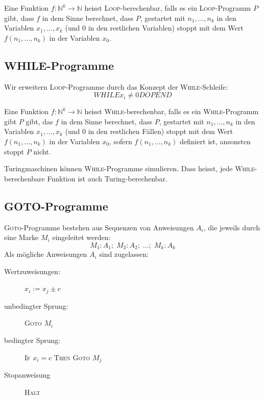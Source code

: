 \documentclass{scrartcl}
\begin{document}
\begin{shaded}
    Eine Funktion $f: \mathds{N}^k\to \mathds{N}$ heisst \textsc{Loop}-berechenbar, falls es ein \textsc{Loop}-Programm $P$ gibt, dass $f$ in dem Sinne berechnet, dass $P$, gestartet mit $n_1,\dots,n_k$ in den Variablen $x_1,\dots,x_k$ (und $0$ in den restlichen Variablen) stoppt mit dem Wert $f(n_1,\dots,n_k)$ in der Variablen $x_0$.
\end{shaded}

\subsection*{WHILE-Programme}
Wir erweitern \textsc{Loop}-Programme durch das Konzept der \textsc{While}-Schleife: \[ WHILE x_i\not=0 DO P END \]

\begin{shaded}
    Eine Funktion $f:\mathds{N}^k\to \mathds{N}$ heisst \textsc{While}-berechenbar, falls es ein \textsc{While}-Programm gibt $P$ gibt, das $f$ in dem Sinne berechnet, dass $P$, gestartet mit $n_1,\dots,n_k$ in den Variablen $x_1,\dots,x_k$ (und 0 in den restlichen Fällen) stoppt mit dem Wert $f(n_1,\dots,n_k)$ in der Variablen $x_0$, sofern $f(n_1,\dots,n_k)$ definiert ist, ansonsten stoppt $P$ nicht.
\end{shaded}

\begin{shaded}
    Turingmaschinen können \textsc{While}-Programme simulieren. Dass heisst, jede \textsc{While}-berechenbare Funktion ist auch Turing-berechenbar.
\end{shaded}

\subsection*{GOTO-Programme}
\textsc{Goto}-Programme bestehen aus Sequenzen von Anweisungen $A_i$, die jeweils durch eine Marke $M_i$ eingeleitet werden: \[ M_1:A_1;\;M_2:A_2;\;\dots;\;M_k:A_k \] Als mögliche Anweisungen $A_i$ sind zugelassen:
\begin{description}
    \item[Wertzuweisungen:]  $x_i:=x_j\pm c$
    \item[unbedingter Sprung:] \textsc{Goto} $M_i$
    \item[bedingter Sprung:] \textsc{If} $x_i=c$ \textsc{Then Goto} $M_j$
    \item[Stopanweisung] \textsc{Halt}
\end{description}
\end{document}
